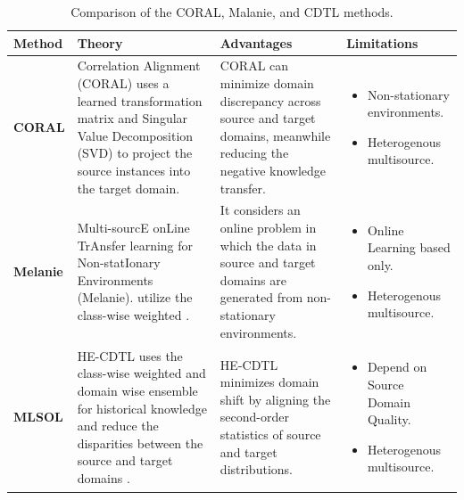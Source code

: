 \begin{table}[!ht]
    \centering
    \caption{Comparison of the CORAL, Malanie, and CDTL methods.}
    \label{table:transfer}
    \small %
    \renewcommand{\arraystretch}{1} %
    \setlength{\tabcolsep}{4pt} %
    \setlength{\arrayrulewidth}{0.15mm}
    \begin{tabularx}{\textwidth}{|>{\centering\arraybackslash\bfseries}p{2cm}|
                                       >{\raggedright\arraybackslash}X|
                                       >{\raggedright\arraybackslash}X|
                                       >{\raggedright\arraybackslash}X|}
    \hline
    \textbf{Method} & \textbf{Theory} & \textbf{Advantages} & \textbf{Limitations} \\ 
    \hline
    \textbf{CORAL} & 
    Correlation Alignment (CORAL) uses a learned transformation matrix and Singular Value Decomposition (SVD)  to project the source instances into the target domain. & 
    CORAL can minimize domain discrepancy across
source and target domains, meanwhile reducing the negative
knowledge transfer. & 
    \begin{itemize}[leftmargin=*]
        \item Non-stationary environments.
        \item Heterogenous multisource.
    \end{itemize} \\ 
    \hline
    \textbf{Melanie} & 
    Multi-sourcE onLine TrAnsfer
learning for Non-statIonary Environments (Melanie). utilize the class-wise weighted . & 
It considers
an online problem in which the data in source and target
domains are generated from non-stationary environments. & 
    \begin{itemize}[leftmargin=*]
        \item Online Learning based only.
        \item Heterogenous multisource.
    \end{itemize} \\
    \hline
    \textbf{MLSOL} & 
    HE-CDTL uses the class-wise weighted and domain wise ensemble for historical knowledge and reduce the disparities between the source and target domains . & 
    HE-CDTL minimizes domain shift by aligning the second-order statistics of source and target distributions. & 
    \begin{itemize}[leftmargin=*]
        \item Depend on Source Domain Quality.
        \item Heterogenous multisource.
    \end{itemize} \\
    \hline
    \end{tabularx}
    \end{table}
